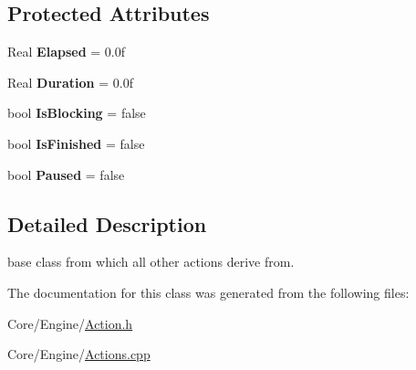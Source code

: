 \subsection*{Protected Attributes}
\begin{DoxyCompactItemize}
\item 
\hypertarget{classDCEngine_1_1Action_adf8b42c7ff24649edc881d52446b288d}{Real {\bfseries Elapsed} = 0.\-0f}\label{classDCEngine_1_1Action_adf8b42c7ff24649edc881d52446b288d}

\item 
\hypertarget{classDCEngine_1_1Action_a1ef1f22139f834d4578d2f5848dec16b}{Real {\bfseries Duration} = 0.\-0f}\label{classDCEngine_1_1Action_a1ef1f22139f834d4578d2f5848dec16b}

\item 
\hypertarget{classDCEngine_1_1Action_aff1c14ed954cef1c419dd83cfd80814a}{bool {\bfseries Is\-Blocking} = false}\label{classDCEngine_1_1Action_aff1c14ed954cef1c419dd83cfd80814a}

\item 
\hypertarget{classDCEngine_1_1Action_a48d11994852f04abd193468ce349bae6}{bool {\bfseries Is\-Finished} = false}\label{classDCEngine_1_1Action_a48d11994852f04abd193468ce349bae6}

\item 
\hypertarget{classDCEngine_1_1Action_aa3239bf19a3b23e22fe664c913975bd1}{bool {\bfseries Paused} = false}\label{classDCEngine_1_1Action_aa3239bf19a3b23e22fe664c913975bd1}

\end{DoxyCompactItemize}


\subsection{Detailed Description}
base class from which all other actions derive from. 

The documentation for this class was generated from the following files\-:\begin{DoxyCompactItemize}
\item 
Core/\-Engine/\hyperlink{Action_8h}{Action.\-h}\item 
Core/\-Engine/\hyperlink{Actions_8cpp}{Actions.\-cpp}\end{DoxyCompactItemize}
